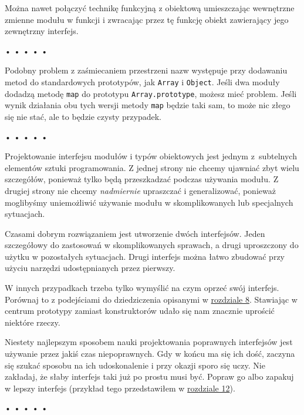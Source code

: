 Można nawet połączyć technikę funkcyjną z obiektową umieszczając wewnętrzne zmienne modułu w funkcji i zwracając przez tę funkcję obiekt zawierający jego zewnętrzny interfejs.



\begin{center}
• • • • •
\end{center}

  
Podobny problem z zaśmiecaniem przestrzeni nazw występuje przy dodawaniu metod do standardowych prototypów, jak \texttt{Array} i \texttt{Object}. Jeśli dwa moduły dodadzą metodę \texttt{map} do prototypu \texttt{Array.prototype}, możesz mieć problem. Jeśli wynik działania obu tych wersji metody \texttt{map} będzie taki sam, to może nic złego się nie stać, ale to będzie czysty przypadek.



\begin{center}
• • • • •
\end{center}

  
Projektowanie interfejsu modułów i typów obiektowych jest jednym z~subtelnych elementów sztuki programowania. Z jednej strony nie chcemy ujawniać zbyt wielu szczegółów,  ponieważ tylko będą przeszkadzać podczas używania modułu. Z drugiej strony nie chcemy \emph{nadmiernie} upraszczać i generalizować, ponieważ moglibyśmy uniemożliwić używanie modułu w skomplikowanych lub specjalnych sytuacjach.

  
Czasami dobrym rozwiązaniem jest utworzenie dwóch interfejsów. Jeden szczegółowy do zastosowań w skomplikowanych sprawach, a drugi uproszczony do użytku w pozostałych sytuacjach. Drugi interfejs można łatwo zbudować przy użyciu narzędzi udostępnianych przez pierwszy.

  
W innych przypadkach trzeba tylko wymyślić na czym oprzeć swój interfejs. Porównaj to z podejściami do dziedziczenia opisanymi w \hyperref[chap:8]{rozdziale 8}. Stawiając w centrum prototypy zamiast konstruktorów udało się nam znacznie uprościć niektóre rzeczy.

  
Niestety najlepszym sposobem nauki projektowania poprawnych interfejsów jest używanie przez jakiś czas niepoprawnych. Gdy w końcu ma się ich dość, zaczyna się szukać sposobu na ich udoskonalenie i przy okazji sporo się uczy. Nie zakładaj, że słaby interfejs taki już po prostu musi być. Popraw go albo zapakuj w lepszy interfejs (przykład tego przedstawiłem w \hyperref[chap:12]{rozdziale 12}).



\begin{center}
• • • • •
\end{center}

